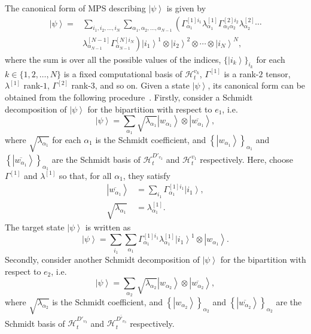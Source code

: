 \documentclass[preprintnumbers,aps,amsmath,amssymb,pra,twocolumn,showpacs,superscriptaddress,floatfix]{revtex4-1}
\def\Ket#1{\left|#1\right\rangle}
\theoremstyle{plain}
\theoremstyle{definition}
\theoremstyle{remark}
\begin{document}
The canonical form of MPS describing $\Ket{\psi}$ is given by
\begin{equation}
    \begin{split}
        \Ket\psi =& \sum_{i_1,i_2,\ldots,i_N}\sum_{\alpha_1,\alpha_2,\ldots,\alpha_{N-1}}
        \left(\Gamma_{\alpha_1}^{[1]i_1}\lambda_{\alpha_1}^{[1]}\Gamma_{\alpha_1 \alpha_2}^{[2]i_2}\lambda_{\alpha_2}^{[2]}\cdots\right.\\
        &\left.\lambda_{\alpha_{N-1}}^{[N-1]}\Gamma_{\alpha_{N-1}}^{[N]i_N}\right)\Ket{i_1}^{1}\otimes\Ket{i_2}^{2}\otimes\cdots\otimes\Ket{i_N}^{N},
    \end{split}
    \label{eq:canonical}
\end{equation}
where the sum is over all the possible values of the indices, ${\{\Ket{i_k}\}}_{i_k}$ for each $k\in\{1,2,\ldots,N\}$ is a fixed computational basis of $\mathcal{H}^{v_k}_t$, $\Gamma^{[1]}$ is a rank-$2$ tensor, $\lambda^{[1]}$ rank-$1$, $\Gamma^{[2]}$ rank-$3$, and so on.
Given a state $\Ket\psi$, its canonical form can be obtained from the following procedure~\cite{APractical}.
Firstly, consider a Schmidt decomposition of $\Ket\psi$ for the bipartition with respect to $e_1$, i.e.\
\[
\Ket\psi = \sum_{\alpha_1}\sqrt{\lambda_{\alpha_1}}\Ket{w_{\alpha_1}}\otimes\Ket{\overline{w_{\alpha_1}}},
\]
where $\sqrt{\lambda_{\alpha_1}}$ for each $\alpha_1$ is the Schmidt coefficient, and ${\left\{\Ket{w_{\alpha_1}}\right\}}_{\alpha_1}$ and ${\left\{\Ket{\overline{w_{\alpha_1}}}\right\}}_{\alpha_1}$ are the Schmidt basis of $\mathcal{H}^{D'_{v_2}}_t$ and $\mathcal{H}^{v_1}_t$ respectively.
Here, choose $\Gamma^{[1]}$ and $\lambda^{[1]}$ so that, for all $\alpha_1$, they satisfy
\begin{align*}
    \Ket{\overline{w_{\alpha_1}}} &= \sum_{i_1}\Gamma_{\alpha_1}^{[1]i_1}\Ket{i_1},\\
    \sqrt{\lambda_{\alpha_1}} &= \lambda_{\alpha_1}^{[1]}.
\end{align*}
The target state $\Ket\psi$ is written as
\[
    \Ket\psi = \sum_{i_1}\sum_{\alpha_1}\Gamma_{\alpha_1}^{[1]i_1}\lambda_{\alpha_1}^{[1]}\Ket{i_1}^{1}\otimes\Ket{w_{\alpha_1}}.
\]
Secondly, consider another Schmidt decomposition of $\Ket\psi$ for the bipartition with respect to $e_2$, i.e.\
\[
\Ket\psi = \sum_{\alpha_2}\sqrt{\lambda_{\alpha_2}}\Ket{w_{\alpha_2}}\otimes\Ket{\overline{w_{\alpha_2}}},
\]
where $\sqrt{\lambda_{\alpha_2}}$ is the Schmidt coefficient, and ${\left\{\Ket{w_{\alpha_2}}\right\}}_{\alpha_2}$ and ${\left\{\Ket{\overline{w_{\alpha_2}}}\right\}}_{\alpha_2}$ are the Schmidt basis of $\mathcal{H}^{D'_{v_3}}_t$ and $\mathcal{H}^{\overline{D'_{v_3}}}_t$ respectively.
\end{document}
